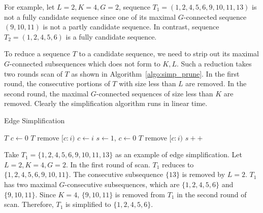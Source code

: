 For example, let $L = 2, K = 4, G = 2$, sequence $T_1=(1,2,4,5,6,9,10,11,13)$ is 
not a fully candidate sequence since one of its maximal $G$-connected sequence $(9,10,11)$
is not a partly candidate sequence. In contrast, sequence $T_2=(1,2,4,5,6)$ is 
a fully candidate sequence.

To reduce a sequence $T$ to a candidate sequence, we need to strip out its 
maximal $G$-connected subsequences which does not form to $K,L$. Such a reduction
takes two rounds scan of $T$ as shown in Algorithm~\ref{algo:simp_prune}. In the 
first round, the consecutive portions of $T$ with size less than $L$ are removed.
In the second round, the maximal $G$-connected sequences of size less than $K$ are
removed. Clearly the simplification algorithm runs in linear time.
\begin{algorithm}
\caption{Edge Simplification}
\label{algo:simp_prune}
\begin{algorithmic}[1]
\Require $T$
\State $c \gets 0$
			\State $T$ remove $[c:i)$
		\EndIf
		\State $c \gets i$
	\EndIf
\EndFor
{}
\State $s\gets 1$, $c\gets 0$
			\State $T$ remove $[c:i)$
		\EndIf
	\Else
		\State $s++$
	\EndIf
\EndFor
\end{algorithmic}
\end{algorithm}

\begin{example}
Take $T_1=\{1,2,4,5,6,9,10,11,13\}$ as an example of edge simplification. Let $L = 2, K = 4, G = 2$.
In the first round of scan. $T_1$ reduces to $\{1,2,4,5,6,9,10,11\}$. The consecutive subsequence $\{13\}$
is removed by $L=2$. $T_1$ has two maximal $G$-consecutive subsequences, which 
are $\{1,2,4,5,6\}$ and $\{9,10,11\}$. Since $K=4$, $\{9,10,11\}$ is removed
from $T_1$ in the second round of scan. Therefore, $T_1$ is simplified to $\{1,2,4,5,6\}$.
\end{example}

%


